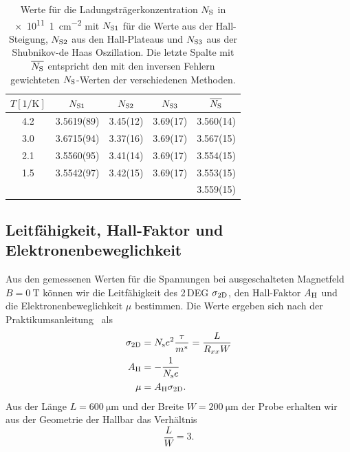 \documentclass[paper=a4,fontsize=10pt,DIV=18,twocolumn,parskip=half]{scrartcl}
\numberwithin{equation}{section}    %
\newcommand{\kor}[1]{{\color{darkgreen}#1}}
\begin{document}
\begin{table}[htp]
	\begin{center}
		\begin{tabular}{ccccc}
			\hline
			$T[1/\mathrm{K}]$ & $N_{\rm S1}$ & $N_{\rm S2}$ & $N_{\rm S3}$ & $\overline{N_{\rm S}}$\\
			\hline
			4.2 & \kor{3.5619(89)} & \kor{3.45(12)} & \kor{3.69(17)} & \kor{3.560(14)}\\
			3.0 & \kor{3.6715(94)} & \kor{3.37(16)} & \kor{3.69(17)} & \kor{3.567(15)}\\
			2.1 & \kor{3.5560(95)} & \kor{3.41(14)} & \kor{3.69(17)} & \kor{3.554(15)}\\
			1.5 & \kor{3.5542(97)} & \kor{3.42(15)} & \kor{3.69(17)} & \kor{3.553(15)}\\
			\hline
			\hline
			 &  &  &  &\kor{3.559(15)}\\
		\end{tabular}
		\caption{Werte für die Ladungsträgerkonzentration $N_{\rm S}$ in \SI[per-mode=symbol]{e11}{1\per\centi\meter\squared} mit $N_{\rm S1}$ für die Werte aus der Hall-Steigung, $N_{\rm S2}$ aus den Hall-Plateaus und $N_{\rm S3}$ aus der Shubnikov-de Haas Oszillation. Die letzte Spalte mit $\overline{N_{\rm S}}$ entspricht den mit den inversen Fehlern gewichteten $N_{\rm S}$-Werten der verschiedenen Methoden.}
		\label{nswerte}
	\end{center}
\end{table}

\subsection{Leitfähigkeit, Hall-Faktor und Elektronenbeweglichkeit}
\label{a3}

Aus den gemessenen Werten für die Spannungen bei ausgeschalteten Magnetfeld $B=\SI{0}{\tesla}$ können wir die Leitfähigkeit des 2\,DEG $\sigma_{\rm 2D}$, den Hall-Faktor $A_{\rm H}$ und die Elektronenbeweglichkeit $\mu$ bestimmen. Die Werte ergeben sich nach der Praktikumsanleitung~\citep{anleitung} als
\begin{align}
	\sigma_{\rm 2D} &= N_{\rm s} e^2 \frac{\tau}{m^*} = \frac{L}{R_{xx} W}\\
	A_{\rm H} 		&= -\frac{1}{N_{\rm s}e}\\
	\mu 			&= A_{\rm H} \sigma_{\rm 2D}.
	\label{eq.leithallbeweg}
\end{align}
Aus der Länge $L=\SI{600}{\micro\meter}$ und der Breite $W=\SI{200}{\micro\meter}$ der Probe erhalten wir aus der Geometrie der Hallbar das Verhältnis
\begin{equation}
	\frac{L}{W} = 3.
\end{equation}
\end{document}
